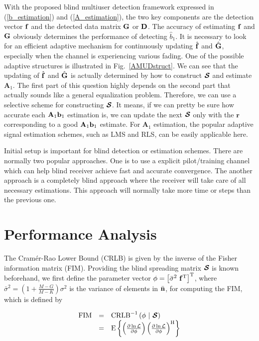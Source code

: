 \documentclass[a4paper,10pt,fleqn, twocolumn]{IEEETran}
\newcommand{\br}{{\mathbf r}}
\newcommand{\bA}{{\mathbf A}}
\newcommand{\bb}{{\bf b}}
\newcommand{\bG}{{\bf G}}
\newcommand{\bn}{{\bf n}}
\newcommand{\bbf}{{\bf f}}
\newcommand{\bD}{{\bf D}}
\newcommand{\bcS}{{\mbox {\boldmath ${\cal S}$}}}
\begin{document}
With the proposed blind multiuser detection framework expressed in
(\ref{b_estimation}) and (\ref{A_estimation}), the two key
components are the detection vector $\bbf$ and the detected data
matrix $\bG$ or $\bD$. The accuracy of estimating $\bbf$ and $\bG$
obviously determines the performance of detecting $\hat{b}_1$. It
is necessary to look for an efficient adaptive mechanism for
continuously updating $\hat{\bbf}$ and $\hat{\bG}$, especially
when the channel is experiencing various fading. One of the
possible adaptive structures is illustrated in
Fig.~\ref{AMUDstruct}. We can see that the updating of
$\hat{\bbf}$ and $\hat{\bG}$ is actually determined by how to
construct $\bcS$ and estimate $\bA_1$. The first part of this
question highly depends on the second part that actually sounds
like a general equalization problem. Therefore, we can use a
selective scheme for constructing $\bcS$. It means, if we can
pretty be sure how accurate each $\bA_1\bb_1$ estimation is, we
can update the next $\bcS$ only with the $\br$ corresponding to a
good $\bA_1\bb_1$ estimate. For $\bA_1$ estimation, the popular
adaptive signal estimation schemes, such as LMS and RLS, can be
easily applicable here.

Initial setup is important for blind detection or estimation
schemes. There are normally two popular approaches. One is to use
a explicit pilot/training channel which can help blind receiver
achieve fast and accurate convergence. The another approach is a
completely blind approach where the receiver will take care of all
necessary estimations. This approach will normally take more time
or steps than the previous one.

\section{Performance Analysis}

The Cram\'{e}r-Rao Lower Bound (CRLB) is given by the inverse of
the Fisher information matrix (FIM). Providing the blind spreading
matrix $\bcS$ is known beforehand, we first define the parameter
vector $\mathbf{\phi} = \left[\bar{\sigma}^{2}\ \bbf^{\rm
T}\right]^{\rm T}$, where $\bar{\sigma}^{2}
=(1+\frac{M-G}{M-K})\sigma^{2}$ is the variance of elements in
$\bar\bn$, for computing the FIM, which is defined by

\begin{equation}
\begin{array}{rcl}
{\rm FIM}&=&{\rm CRLB}^{-1}\left(\mathbf{\phi}\ |\ \bcS\right)\\
&=& {\rm E} \left\{ \left( \frac{\partial \ln{\cal L}}{\partial
\mathbf{\phi}} \right) \left( \frac{\partial \ln{\cal L}}{\partial
\mathbf{\phi}} \right)^{\rm H} \right\} \label{fim}
\end{array}
\end{equation}
\end{document}
